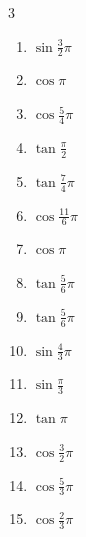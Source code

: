\begin{multicols}{3}
\begin{enumerate}
  \item $\displaystyle \sin{\frac{3}{2}\pi}$
        \phantom{$\displaystyle =-1$}

  \item $\displaystyle \cos{\pi}$
        \phantom{$\displaystyle =-1$}

  \item $\displaystyle \cos{\frac{5}{4}\pi}$

  \item $\displaystyle \tan{\frac{\pi}{2}}$
        \phantom{$\displaystyle \quad なし$}

  \item $\displaystyle \tan{\frac{7}{4}\pi}$
        \phantom{$\displaystyle =-1$}

  \item $\displaystyle \cos{\frac{11}{6}\pi}$

  \item $\displaystyle \cos{\pi}$
        \phantom{$\displaystyle =-1$}

  \item $\displaystyle \tan{\frac{5}{6}\pi}$

\columnbreak %

  \item $\displaystyle \tan{\frac{5}{6}\pi}$

  \item $\displaystyle \sin{\frac{4}{3}\pi}$

  \item $\displaystyle \sin{\frac{\pi}{3}}$

  \item $\displaystyle \tan{\pi}$
        \phantom{$\displaystyle =0$}

  \item $\displaystyle \cos{\frac{3}{2}\pi}$
        \phantom{$\displaystyle =0$}

  \item $\displaystyle \cos{\frac{5}{3}\pi}$

  \item $\displaystyle \cos{\frac{2}{3}\pi}$


\end{enumerate}
\end{multicols}
